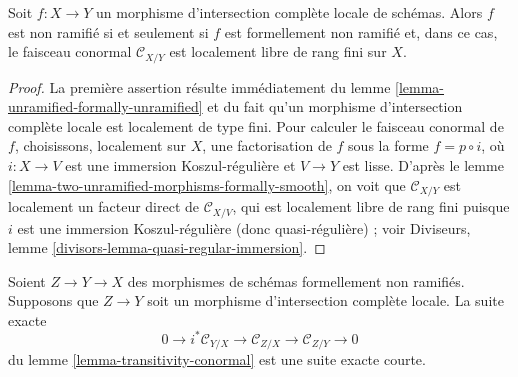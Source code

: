 \begin{lemma}
\label{lemma-unramified-lci}
Soit $f : X \to Y$ un morphisme d'intersection complète locale de schémas.
Alors $f$ est non ramifié si et seulement si $f$ est formellement non ramifié et,
dans ce cas, le faisceau conormal $\mathcal{C}_{X/Y}$ est localement libre de rang fini
sur $X$.
\end{lemma}

\begin{proof}
La première assertion résulte immédiatement du
lemme \ref{lemma-unramified-formally-unramified}
et du fait qu'un morphisme d'intersection complète locale est localement
de type fini. Pour calculer le faisceau conormal de $f$, choisissons, localement
sur $X$, une factorisation de $f$ sous la forme $f = p \circ i$, où $i : X \to V$
est une immersion Koszul-régulière et $V \to Y$ est lisse. D'après le
lemme \ref{lemma-two-unramified-morphisms-formally-smooth},
on voit que $\mathcal{C}_{X/Y}$ est localement un facteur direct de
$\mathcal{C}_{X/V}$, qui est localement libre de rang fini puisque $i$ est une immersion
Koszul-régulière (donc quasi-régulière) ; voir
Diviseurs, lemme \ref{divisors-lemma-quasi-regular-immersion}.
\end{proof}

\begin{lemma}
\label{lemma-transitivity-conormal-lci}
Soient $Z \to Y \to X$ des morphismes de schémas formellement non ramifiés.
Supposons que $Z \to Y$ soit un morphisme d'intersection complète locale.
La suite exacte
$$
0 \to i^*\mathcal{C}_{Y/X} \to
\mathcal{C}_{Z/X} \to
\mathcal{C}_{Z/Y} \to 0
$$
du
lemme \ref{lemma-transitivity-conormal}
est une suite exacte courte.
\end{lemma}

